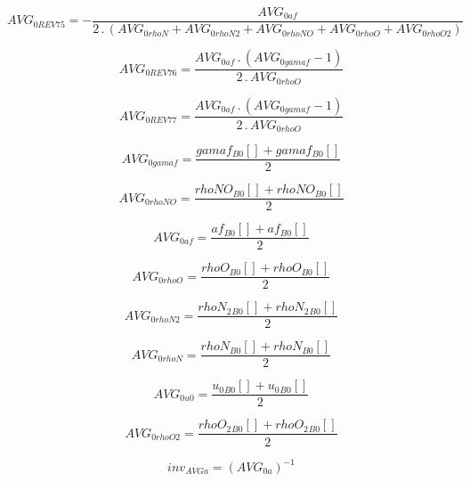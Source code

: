 \documentclass{article}
\begin{document}
\begin{dmath}AVG_{0 REV 75} = - \frac{AVG_{0 af}}{2 \,.\, \left(AVG_{0 rhoN} + AVG_{0 rhoN2} + AVG_{0 rhoNO} + AVG_{0 rhoO} + AVG_{0 rhoO2}\right)}\end{dmath}

\begin{dmath}AVG_{0 REV 76} = \frac{AVG_{0 af} \,.\, \left(AVG_{0 gamaf} - 1\right)}{2 \,.\, AVG_{0 rhoO}}\end{dmath}

\begin{dmath}AVG_{0 REV 77} = \frac{AVG_{0 af} \,.\, \left(AVG_{0 gamaf} - 1\right)}{2 \,.\, AVG_{0 rhoO}}\end{dmath}

\begin{dmath}AVG_{0 gamaf} = \frac{{gamaf{_{B0}}}[{}] + {gamaf{_{B0}}}[{}]}{2}\end{dmath}

\begin{dmath}AVG_{0 rhoNO} = \frac{{rhoNO{_{B0}}}[{}] + {rhoNO{_{B0}}}[{}]}{2}\end{dmath}

\begin{dmath}AVG_{0 af} = \frac{{af{_{B0}}}[{}] + {af{_{B0}}}[{}]}{2}\end{dmath}

\begin{dmath}AVG_{0 rhoO} = \frac{{rhoO{_{B0}}}[{}] + {rhoO{_{B0}}}[{}]}{2}\end{dmath}

\begin{dmath}AVG_{0 rhoN2} = \frac{{rhoN_{2}{_{B0}}}[{}] + {rhoN_{2}{_{B0}}}[{}]}{2}\end{dmath}

\begin{dmath}AVG_{0 rhoN} = \frac{{rhoN{_{B0}}}[{}] + {rhoN{_{B0}}}[{}]}{2}\end{dmath}

\begin{dmath}AVG_{0 u0} = \frac{{u_{0}{_{B0}}}[{}] + {u_{0}{_{B0}}}[{}]}{2}\end{dmath}

\begin{dmath}AVG_{0 rhoO2} = \frac{{rhoO_{2}{_{B0}}}[{}] + {rhoO_{2}{_{B0}}}[{}]}{2}\end{dmath}

\begin{dmath}inv_{AVG a} = \left(AVG_{0 a} \right)^{-1}\end{dmath}
\end{document}
